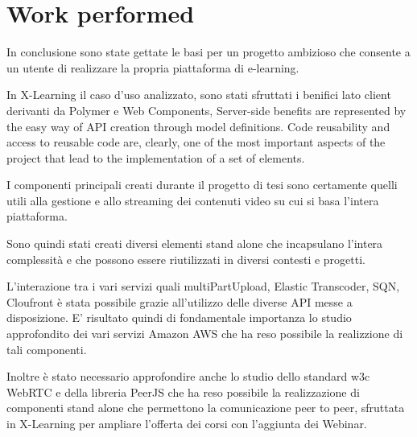 \section{Work performed}
\label{sec:work_performed}
 
In conclusione sono state gettate le basi per un progetto ambizioso che consente a un utente di realizzare la propria piattaforma di e-learning.

In X-Learning il caso d'uso analizzato, sono stati sfruttati i benifici lato client derivanti da Polymer e Web Components, Server-side benefits are represented by the easy way of API creation through model definitions.
Code reusability and access to reusable code are, clearly, one of the most important aspects of the project that lead to the implementation of a set of elements.

I componenti principali creati durante il progetto di tesi sono certamente quelli utili alla gestione e allo streaming dei contenuti video su cui si basa l'intera piattaforma.

Sono quindi stati creati diversi elementi stand alone che incapsulano l'intera complessità e che possono essere riutilizzati in diversi contesti e progetti.

L'interazione tra i vari servizi quali multiPartUpload, Elastic Transcoder, SQN, Cloufront è stata possibile grazie all'utilizzo delle diverse API messe a disposizione.
E' risultato quindi di fondamentale importanza lo studio approfondito dei vari servizi Amazon AWS che ha reso possibile la realizzione di tali componenti.

Inoltre è stato necessario approfondire anche lo studio dello standard w3c WebRTC e della libreria PeerJS che ha reso possibile la realizzazione di componenti stand alone che permettono la comunicazione peer to peer, sfruttata in X-Learning per ampliare l'offerta dei corsi con l'aggiunta dei Webinar.